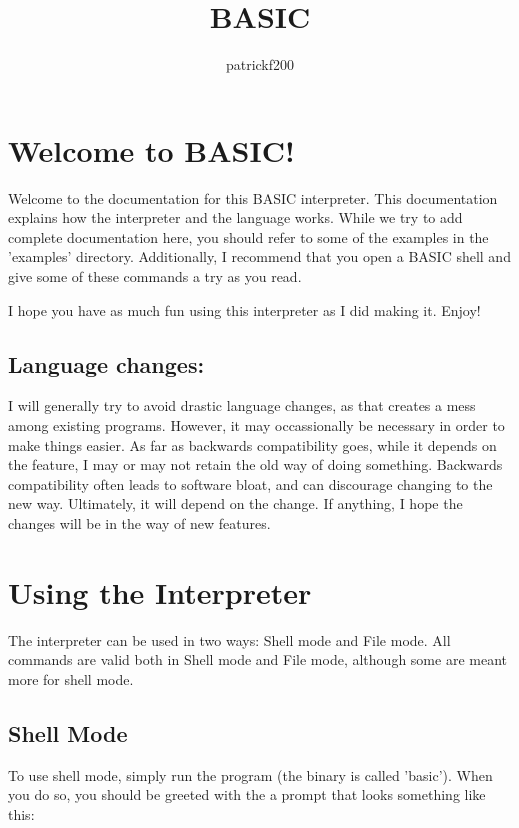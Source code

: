 \documentclass{report}
\begin{document}
\title{BASIC}
\author{patrickf200}
\maketitle

\tableofcontents

\chapter{Welcome to BASIC!}

Welcome to the documentation for this BASIC interpreter. This documentation explains how the interpreter and the language works. While we try to add complete documentation here, you should refer to some of the examples in the 'examples' directory. Additionally, I recommend that you open a BASIC shell and give some of these commands a try as you read.
\newline

\noindent
I hope you have as much fun using this interpreter as I did making it. Enjoy!
\newline

\section{Language changes:}

I will generally try to avoid drastic language changes, as that creates a mess among existing programs. However, it may occassionally be necessary in order to make things easier. As far as backwards compatibility goes, while it depends on the feature, I may or may not retain the old way of doing something. Backwards compatibility often leads to software bloat, and can discourage changing to the new way. Ultimately, it will depend on the change. If anything, I hope the changes will be in the way of new features.

\chapter{Using the Interpreter}
The interpreter can be used in two ways: Shell mode and File mode. All commands are valid both in Shell mode and File mode, although some are meant more for shell mode.

\section{Shell Mode}
To use shell mode, simply run the program (the binary is called 'basic'). When you do so, you should be greeted with the a prompt that looks something like this:
\end{document}
